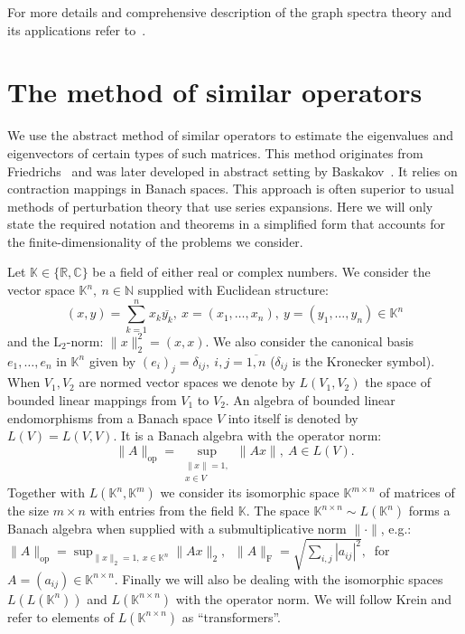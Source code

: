 \documentclass[a4paper]{jpconf}
\begin{document}
For more details and comprehensive description
    of the graph spectra theory
    and its applications
    refer to~\cite{cvetkovic1980spectra,cvetkovic2010introduction,godsil2013algebraic}.

\section{The method of similar operators}

We use the abstract method of similar operators
    to estimate the eigenvalues and eigenvectors
    of certain types of such matrices.
This method originates from Friedrichs~\cite{friedrichs1965advanced}
    and was later developed in abstract setting
    by Baskakov~\cite{baskakov1983methods,baskakov2014memory,baskakov2017method,baskakov2013completeness}.
It relies on contraction mappings in Banach spaces.
This approach is often superior to usual methods of perturbation theory
    that use series expansions.
Here we will only state the required notation and theorems
    in a simplified form that accounts
    for the finite-dimensionality
    of the problems we consider.

Let \( \mathbb{K}\in \{ \mathbb{R}, \mathbb{C} \} \)
    be a field of either real or complex numbers.
We consider the vector space \( \mathbb{K}^n,\ n\in \mathbb{N} \)
    supplied with Euclidean structure:
    \[
        (x, y){=}\sum_{k=1}^n x_k\overline{y_k},
        \ x{=}(x_1,\ldots, x_n),
        \ y=(y_1,\ldots, y_n)
        \in \mathbb{K}^n
        \]
    and the \( \mathrm{L}_2 \)-norm:
    \(
        \|x\|_2^2{=}(x,x).
        \)
We also consider the canonical basis \( e_1, \ldots, e_n \)
    in \( \mathbb{K}^n \) given by
    \( {(e_i)}_j = \delta_{ij},\ i,j=\overline{1,n} \)
    (\(\delta_{ij} \) is the Kronecker symbol).
When \( V_1, V_2 \) are normed vector spaces
    we denote by \( L(V_1, V_2) \)
    the space of bounded linear mappings
    from \( V_1 \) to \( V_2 \).
An algebra of bounded linear endomorphisms
    from a Banach space \( V \)
    into itself
    is denoted by \( L(V) = L(V, V) \).
It is a Banach algebra with the operator norm:
    \[
        \|A\|_{\mathrm{op}} =
        \sup_{
            \substack{\|x\|=1,\\ x\in V}
        } \|A x\|,\ A\in L(V).
        \]
Together with \( L(\mathbb{K}^n, \mathbb{K}^m) \)
    we consider its isomorphic space \( \mathbb{K}^{m{\times}n} \)
    of matrices of the size \( m{\times}n \)
    with entries from the field \( \mathbb{K} \).
The space \( \mathbb{K}^{n{\times}n}\sim L(\mathbb{K}^n) \)
    forms a Banach algebra
    when supplied with a submultiplicative norm
    \( \|\cdot\| \),
    e.g.: \( \|A\|_{\mathrm{op}} = \sup_{\|x\|_2=1,\ x\in \mathbb{K}^n} \|A x\|_2,\ \)
    \( \|A\|_{\mathrm{F}} = \sqrt{\sum_{i,j} |a_{ij}|^2},\ \)
    for 
    \( A{=}(a_{ij})\in\mathbb{K}^{n\times n} \).
Finally we will also be dealing with the isomorphic spaces
    \( L(L(\mathbb{K}^n)) \) and \( L(\mathbb{K}^{n{\times}n}) \)
    with the operator norm.
We will follow Krein
    and refer to elements of \( L(\mathbb{K}^{n{\times}n}) \)
    as ``transformers''.
\end{document}
